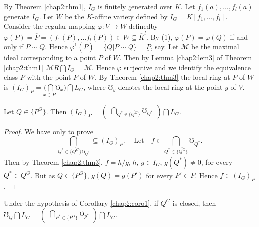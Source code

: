 \medskip
{}
By Theorem \ref{chap2:thm1}, $I_G$ is finitely generated over $K$. Let
 $f_{1}(a),\ldots , f_{l}(a)$ generate $I_{G}$. Let $W$ be the
 $K$-affine variety defined by $I_{G} = K[f_{1}, \ldots
   ,f_{l}]$. Consider the regular mapping $\varphi : V \rightarrow W$
 defined\pageoriginale by $\varphi (P) = \overline{P} = (f_1(P),
 \ldots f_{l}(P)) 
 \in W \subseteq \overline{K}^{l}$. By (1), $\varphi (P) = \varphi(Q)$
 if and only if $P \sim Q$. Hence $ \overline{\varphi}^{1}
 (\overline{P}) = \bigg\{Q \big|P \sim Q \bigg\} = \underline{P}$,
 say. Let $  \overline{\mathcal{M}}$ be the maximal ideal
 corresponding to a point $\overline{P}$ of $W$. Then by Lemma
 \ref{chap2:lem3} of 
 Theorem \ref{chap2:thm1} $\overline{\mathcal{M}} R \bigcap I_G =
 \overline{\mathcal{M}}$. Hence $\varphi$ surjective and we identify
 the equivalence class $\underline{P}$ with the point $\overline{P}$
 of $W$. By Theorem \ref{chap2:thm3} the local ring at $\overline{P}$
 of $W$ is $(I_G)_{\overline{P}} = \underset{x \in \underline{P}}{(\bigcap} \mho
 _{x}) \bigcap L_G$, where $\mho_{y}$ denotes the local ring at the
 point $y$ of $V$.  

\begin{corollary}\label{chap2:coro1}%
 Let $Q \in \big\{\overline{P^{G}}\big\}$. Then      
$(I_G)_{\overline{P}} = \begin{pmatrix} \underset{Q^{*} \in
     \big\{\overline{Q^{G}}\big\}}{\bigcap}
   \mho_{Q^{*}} \end{pmatrix} \bigcap L_G$. 
\end{corollary}

\begin{proof}
 We have only to prove  
$$
\bigcap\limits_{Q^{*} \in \big\{\overline{Q^{G}}\big\}  \mho_{Q^{*}}}
 \subseteq (I_G)_{\overline{P}}. \quad \text{ Let} \quad f \in
 \bigcap\limits_{Q^{*} \in    \big\{\overline{Q^{G}}\big\}}
 \mho_{Q^{*}}.  
$$
Then by Theorem \ref{chap2:thm3}, $f = h/g$, $h$, $g \in I_G$, $g
(Q^{*}) \neq 0$, for every $Q^{*} \in Q^{G}$. But as $Q \in 
\big\{\overline{P^{G}}\big\}$, $g(Q) = g(P')$ for every $P' \in
\underline{P}$.  Hence $f \in (I_G)_{\overline{P}}$.  
\end{proof}

\begin{corollary}%
Under the hypothesis of Corollary \ref{chap2:coro1}, if $Q^{G}$ is closed,  then
$\mho_{Q} \bigcap L_G = \left(\begin{smallmatrix} \underset{P^{*} \in
    \big\{\overline{P^{G}}\big\}}{\bigcap}
  \mho_{p^{*}} \end{smallmatrix}\right) \bigcap L_G$.  
\end{corollary}

